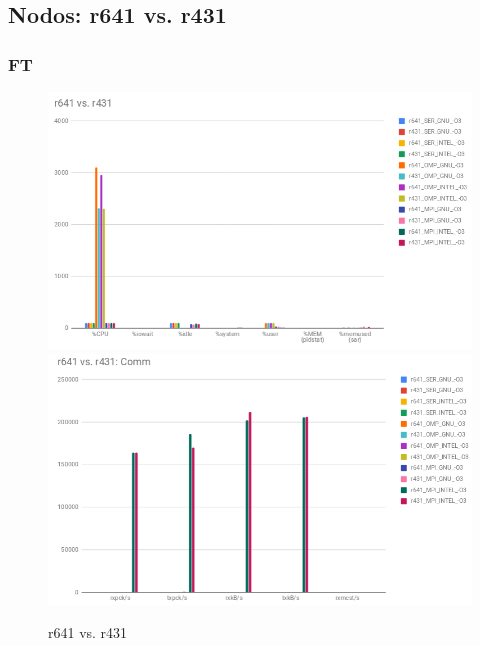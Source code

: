 \documentclass{article}
\begin{document}
\begin{appendices}
\subsection{Nodos: r641 vs. r431}

\subsubsection{FT}

\begin{figure}[H]
    \centering
    \includegraphics[width=12cm]{Pictures/FT_r641_r431_Comp.png}
    \includegraphics[width=12cm]{Pictures/FT_r641_r431_Comm.png}
    \caption{r641 vs. r431}
    \label{fig:FT_r641_r431}
\end{figure}


\end{appendices}
\end{document}
